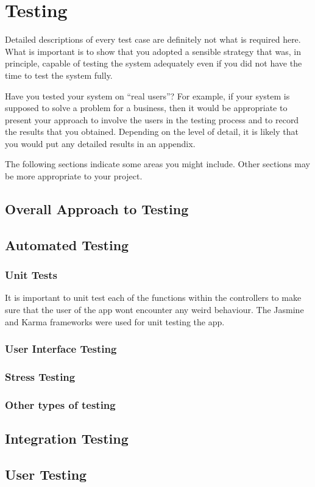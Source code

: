 \chapter{Testing}

Detailed descriptions of every test case are definitely not what is required here. What is important is to show that you adopted a sensible strategy that was, in principle, capable of testing the system adequately even if you did not have the time to test the system fully.

Have you tested your system on ``real users''? For example, if your system is supposed to solve a problem for a business, then it would be appropriate to present your approach to involve the users in the testing process and to record the results that you obtained. Depending on the level of detail, it is likely that you would put any detailed results in an appendix.

The following sections indicate some areas you might include. Other sections may be more appropriate to your project. 

\section{Overall Approach to Testing}

\section{Automated Testing}

\subsection{Unit Tests}
It is important to unit test each of the functions within the controllers to make sure that the user of the app wont encounter any weird behaviour. The Jasmine and Karma frameworks were used for unit testing the app.  

\subsection{User Interface Testing}

\subsection{Stress Testing}

\subsection{Other types of testing}

\section{Integration Testing}

\section{User Testing}